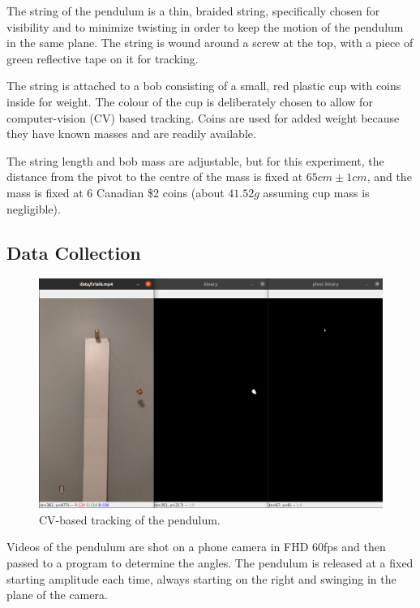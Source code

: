 \documentclass[aps,twocolumn,secnumarabic,nobalancelastpage,amsmath,amssymb,nofootinbib]{revtex4}
\begin{document}
The string of the pendulum is a thin, braided string, specifically chosen for visibility and to minimize twisting in
order to keep the motion of the pendulum in the same plane. The string is wound around a screw at the top, with a piece
of green reflective tape on it for tracking.

The string is attached to a bob consisting of a small, red plastic cup with coins inside for weight. The colour of the
cup is deliberately chosen to allow for computer-vision (CV) based tracking. Coins are used for added weight because
they have known masses and are readily available.

The string length and bob mass are adjustable, but for this experiment, the distance from the pivot to the centre of the
mass is fixed at \(65\si{cm} \pm 1\si{cm}\), and the mass is fixed at 6 Canadian \$2 coins (about \(41.52\si{g}\)
assuming cup mass is negligible).

\subsection{Data Collection}
\label{section:method:data_collection}

\begin{figure}[htb]
    \includegraphics[width=\linewidth]{cv_track.png}
    \caption{CV-based tracking of the pendulum.}
\end{figure}

Videos of the pendulum are shot on a phone camera in FHD 60fps and then passed to a program to determine the angles.
The pendulum is released at a fixed starting amplitude each time, always starting on the right and swinging in the plane
of the camera.
\end{document}
